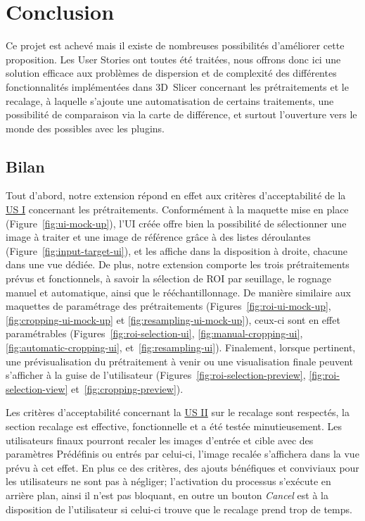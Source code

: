 \documentclass{article}
\begin{document}
{
    \section{Conclusion}
    \label{sec:conclusion}

    Ce projet est achevé mais il existe de nombreuses possibilités d'améliorer cette proposition. Les User Stories ont toutes été traitées, nous offrons donc ici une solution efficace aux problèmes de dispersion et de complexité des différentes fonctionnalités implémentées dans 3D~Slicer concernant les prétraitements et le recalage, à laquelle s'ajoute une automatisation de certains traitements, une possibilité de comparaison via la carte de différence, et surtout l'ouverture vers le monde des possibles avec les plugins.

    {
        \bigskip
        \subsection{Bilan}

        Tout d'abord, notre extension répond en effet aux critères d'acceptabilité de la \hyperref[us:registration]{US I} concernant les prétraitements. Conformément à la maquette mise en place (Figure~\ref{fig:ui-mock-up}), l'UI créée offre bien la possibilité de sélectionner une image à traiter et une image de référence grâce à des listes déroulantes (Figure~\ref{fig:input-target-ui}), et les affiche dans la disposition à droite, chacune dans une vue dédiée. De plus, notre extension comporte les trois prétraitements prévus et fonctionnels, à savoir la sélection de ROI par seuillage, le rognage manuel et automatique, ainsi que le rééchantillonnage. De manière similaire aux maquettes de paramétrage des prétraitements (Figures~\ref{fig:roi-ui-mock-up}, \ref{fig:cropping-ui-mock-up} et \ref{fig:resampling-ui-mock-up}), ceux-ci sont en effet paramétrables (Figures~\ref{fig:roi-selection-ui}, \ref{fig:manual-cropping-ui}, \ref{fig:automatic-cropping-ui}, et~\ref{fig:resampling-ui}). Finalement, lorsque pertinent, une prévisualisation du prétraitement à venir ou une visualisation finale peuvent s'afficher à la guise de l'utilisateur (Figures~\ref{fig:roi-selection-preview}, \ref{fig:roi-selection-view} et~\ref{fig:cropping-preview}).

        \bigskip

        Les critères d'acceptabilité concernant la \hyperref[us:registration]{US II} sur le recalage sont respectés, la section recalage est effective, fonctionnelle et a été testée minutieusement. Les utilisateurs finaux pourront recaler les images d'entrée et cible avec des paramètres Prédéfinis ou entrés par celui-ci, l'image recalée s'affichera dans la vue prévu à cet effet. En plus ce des critères, des ajouts bénéfiques et conviviaux pour les utilisateurs ne sont pas à négliger; l'activation du processus s'exécute en arrière plan, ainsi il n'est pas bloquant, en outre un bouton \textit{Cancel} est à la disposition de l'utilisateur si celui-ci trouve que le recalage prend trop de temps.

}}
\end{document}
